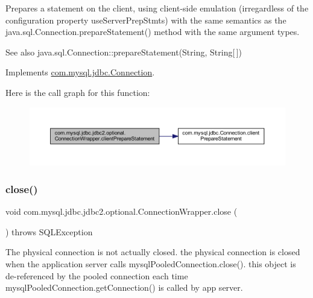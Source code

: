 Prepares a statement on the client, using client-\/side emulation (irregardless of the configuration property \textquotesingle{}use\+Server\+Prep\+Stmts\textquotesingle{}) with the same semantics as the java.\+sql.\+Connection.\+prepare\+Statement() method with the same argument types.

\begin{DoxySeeAlso}{See also}
java.\+sql.\+Connection\+::prepare\+Statement(\+String, String\mbox{[}$\,$\mbox{]}) 
\end{DoxySeeAlso}


Implements \mbox{\hyperlink{interfacecom_1_1mysql_1_1jdbc_1_1_connection_a452a8703aca3c45fdafe3e1a5093b8b5}{com.\+mysql.\+jdbc.\+Connection}}.

Here is the call graph for this function\+:
\nopagebreak
\begin{figure}[H]
\begin{center}
\leavevmode
\includegraphics[width=350pt]{classcom_1_1mysql_1_1jdbc_1_1jdbc2_1_1optional_1_1_connection_wrapper_a7d857e3e39f13e33451b0f491adbd573_cgraph}
\end{center}
\end{figure}
\mbox{\label{classcom_1_1mysql_1_1jdbc_1_1jdbc2_1_1optional_1_1_connection_wrapper_a273eb07d1110be957702fa80230e3b5d}} 
\subsubsection{\texorpdfstring{close()}{close()}}
{\footnotesize\ttfamily void com.\+mysql.\+jdbc.\+jdbc2.\+optional.\+Connection\+Wrapper.\+close (\begin{DoxyParamCaption}{ }\end{DoxyParamCaption}) throws S\+Q\+L\+Exception}

The physical connection is not actually closed. the physical connection is closed when the application server calls mysql\+Pooled\+Connection.\+close(). this object is de-\/referenced by the pooled connection each time mysql\+Pooled\+Connection.\+get\+Connection() is called by app server.


